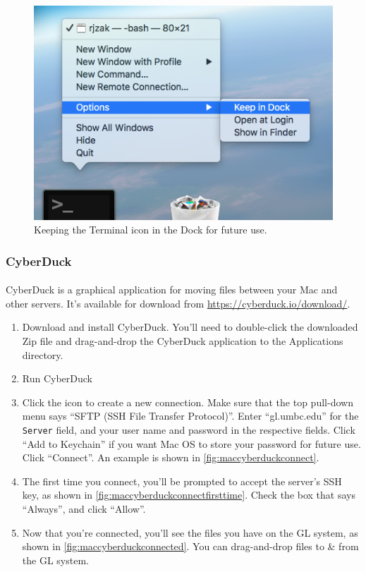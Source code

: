 \documentclass[letter,11pt]{article}
\begin{document}
\begin{figure}
\centering
\includegraphics[scale=0.6]{Images/terminal_keep_in_dock.png}
\caption{Keeping the Terminal icon in the Dock for future use.}
\label{fig:macterminaldock}
\end{figure}

\FloatBarrier
\subsubsection{CyberDuck}
\paragraph{}CyberDuck is a graphical application for moving files between your Mac and other servers. It's available for download from \url{https://cyberduck.io/download/}.

\begin{enumerate}
    \item Download and install CyberDuck. You'll need to double-click the downloaded Zip file and drag-and-drop the CyberDuck application to the Applications directory.
    \item Run CyberDuck
    \item Click the icon to create a new connection. Make sure that the top pull-down menu says ``SFTP (SSH File Transfer Protocol)''. Enter ``gl.umbc.edu'' for the \texttt{Server} field, and your user name and password in the respective fields. Click ``Add to Keychain'' if you want Mac OS to store your password for future use. Click ``Connect''. An example is shown in \autoref{fig:maccyberduckconnect}.
    \item The first time you connect, you'll be prompted to accept the server's SSH key, as shown in \autoref{fig:maccyberduckconnectfirsttime}. Check the box that says ``Always'', and click ``Allow''.
    \item Now that you're connected, you'll see the files you have on the GL system, as shown in \autoref{fig:maccyberduckconnected}. You can drag-and-drop files to \& from the GL system.
\end{enumerate}
\end{document}
